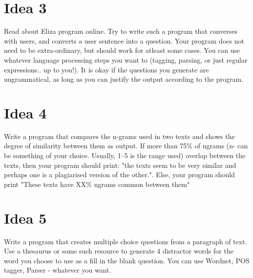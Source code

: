 \documentclass[11pt,a4paper]{article}
\begin{document}
\section*{Idea 3}
Read about Eliza program online. Try to write such a program that converses with users, and converts a user sentence into a question. Your program does not need to be extra-ordinary, but should work for atleast some cases. You can use whatever language processing steps you want to (tagging, parsing, or just regular expressions.. up to you!). It is okay if the questions you generate are ungrammatical, as long as you can justify the output according to the program.

\section*{Idea 4}
Write a program that compares the n-grams used in two texts and shows the degree of similarity between them as output. If more than 75\% of ngrams (n- can be something of your choice. Usually, 1--5 is the range used) overlap between the texts, then your program should print: "the texts seem to be very similar and perhaps one is a plagiarised version of the other.". Else, your program should print "These texts have XX\% ngrams common between them" 

\section*{Idea 5}
Write a program that creates multiple choice questions from a paragraph of text. Use a thesaurus or some such resource to generate 4 distractor words for the word you choose to use as a fill in the blank question. You can use Wordnet, POS tagger, Parser - whatever you want.
\end{document}
